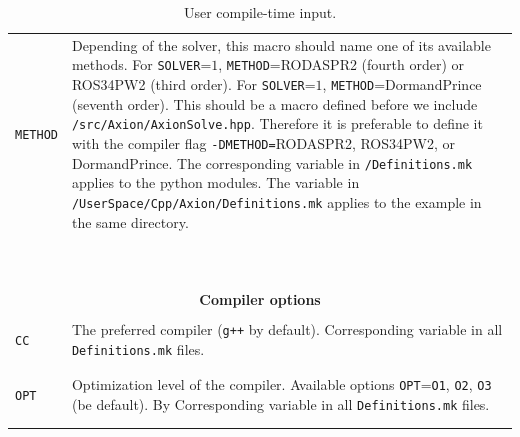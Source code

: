 \documentclass[11pt,a4paper]{article}
\begin{document}
\begin{table}[h!]
\begin{tabular}{l l}
		{\tt METHOD}& \multirow{1}{12cm}{Depending of the solver, this macro should name one of its available methods. 
		For {\tt SOLVER}=$1$, {\tt METHOD}=RODASPR2 (fourth order) or ROS34PW2 (third order). 	
		For {\tt SOLVER}=$1$, {\tt METHOD}=DormandPrince (seventh order). This should be a macro defined before we include {\tt \mimes/src/Axion/AxionSolve.hpp}. Therefore it is preferable to 
		define it with the compiler flag {\tt -DMETHOD=}RODASPR2, ROS34PW2, or DormandPrince.
		The corresponding variable in {\tt \mimes/Definitions.mk} applies to the python modules. The variable in {\tt \mimes/UserSpace/Cpp/Axion/Definitions.mk} applies to the example in the same directory.}\\\\\\\\\\\\\\\\\\\\ 		
		\hline\\[-0.4cm]
		
		\multicolumn{2}{c}{\bf Compiler options}  \\
		\hline\\[-0.4cm]
		
		{\tt CC} &  \multirow{1}{12cm}{The preferred \CPP compiler ({\tt g++} by default). Corresponding variable in all {\tt Definitions.mk} files.} \\\\
		\hline\\[-0.4cm]
		
		{\tt OPT} &  \multirow{1}{12cm}{Optimization level of the compiler. Available options {\tt OPT}={\tt O1}, {\tt O2}, {\tt O3} (be default). By Corresponding variable in all {\tt Definitions.mk} files.}   \\\\
		\hline\\[-0.4cm]

	\end{tabular}
	\caption{User compile-time input.}
	\label{tab:compile_time-input}
\end{table}



\newpage
{}
                        
\end{document}
